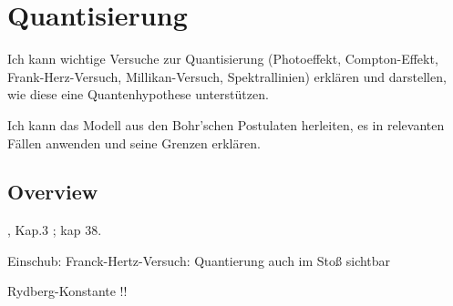 \renewcommand{\lastmod}{10. September 2024}
\renewcommand{\chapterauthors}{Markus Lippitz}

\chapter{Quantisierung}




Ich kann wichtige Versuche zur Quantisierung (Photoeffekt, Compton-Effekt, Frank-Herz-Versuch, Millikan-Versuch, Spektrallinien) erklären und darstellen, wie diese eine Quantenhypothese unterstützen. 

Ich kann das Modell aus den Bohr’schen Postulaten herleiten, es in relevanten Fällen anwenden und seine Grenzen erklären.

\section{Overview}


\cite{Demtröder_ep3}, Kap.3 ;  \cite{Knight_physics} kap 38.

\cite{QM100}


\cite{QM_einstein}


Einschub: Franck-Hertz-Versuch: Quantierung auch im Stoß sichtbar 

Rydberg-Konstante !!









